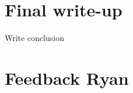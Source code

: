 \documentclass[12pt]{article}
\begin{document}
\section*{Final write-up}
	\begin{coi}
		\item Write conclusion
	\end{coi}
	
\section*{Feedback Ryan}
	\begin{coi}

\end{coi}
\end{document}
